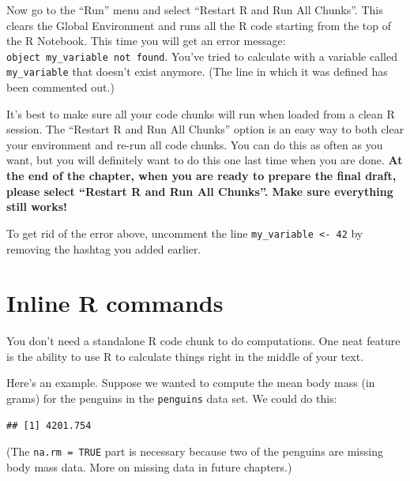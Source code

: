 \documentclass[
]{book}
\newenvironment{Shaded}{\begin{snugshade}}{\end{snugshade}}
\newcommand{\AttributeTok}[1]{\textcolor[rgb]{0.77,0.63,0.00}{#1}}
\newcommand{\ConstantTok}[1]{\textcolor[rgb]{0.00,0.00,0.00}{#1}}
\newcommand{\FunctionTok}[1]{\textcolor[rgb]{0.00,0.00,0.00}{#1}}
\newcommand{\NormalTok}[1]{#1}
\newcommand{\SpecialCharTok}[1]{\textcolor[rgb]{0.00,0.00,0.00}{#1}}
\begin{document}
Now go to the ``Run'' menu and select ``Restart R and Run All Chunks''. This clears the Global Environment and runs all the R code starting from the top of the R Notebook. This time you will get an error message: \texttt{object\ \textquotesingle{}my\_variable\textquotesingle{}\ not\ found}. You've tried to calculate with a variable called \texttt{my\_variable} that doesn't exist anymore. (The line in which it was defined has been commented out.)

It's best to make sure all your code chunks will run when loaded from a clean R session. The ``Restart R and Run All Chunks'' option is an easy way to both clear your environment and re-run all code chunks. You can do this as often as you want, but you will definitely want to do this one last time when you are done. \textbf{At the end of the chapter, when you are ready to prepare the final draft, please select ``Restart R and Run All Chunks''. Make sure everything still works!}

To get rid of the error above, uncomment the line \texttt{my\_variable\ \textless{}-\ 42} by removing the hashtag you added earlier.

\hypertarget{rmark-inline}{%
\section{Inline R commands}\label{rmark-inline}}

You don't need a standalone R code chunk to do computations. One neat feature is the ability to use R to calculate things right in the middle of your text.

Here's an example. Suppose we wanted to compute the mean body mass (in grams) for the penguins in the \texttt{penguins} data set. We could do this:

\begin{Shaded}
\end{Shaded}

\begin{verbatim}
## [1] 4201.754
\end{verbatim}

(The \texttt{na.rm\ =\ TRUE} part is necessary because two of the penguins are missing body mass data. More on missing data in future chapters.)
\end{document}
